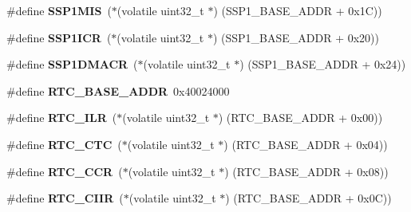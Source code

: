 \begin{DoxyCompactItemize}
\item 
\mbox{\label{group__lpc24xx__regs_gac0b175a58e07fe4a0e092642c783f778}} 
\#define {\bfseries S\+S\+P1\+M\+IS}~($\ast$(volatile uint32\+\_\+t $\ast$) (S\+S\+P1\+\_\+\+B\+A\+S\+E\+\_\+\+A\+D\+DR + 0x1\+C))
\item 
\mbox{\label{group__lpc24xx__regs_gaf86860e9818da75a93859cc1b2bb8ced}} 
\#define {\bfseries S\+S\+P1\+I\+CR}~($\ast$(volatile uint32\+\_\+t $\ast$) (S\+S\+P1\+\_\+\+B\+A\+S\+E\+\_\+\+A\+D\+DR + 0x20))
\item 
\mbox{\label{group__lpc24xx__regs_gadc43e1084fa48f3175dffcd8344bdfea}} 
\#define {\bfseries S\+S\+P1\+D\+M\+A\+CR}~($\ast$(volatile uint32\+\_\+t $\ast$) (S\+S\+P1\+\_\+\+B\+A\+S\+E\+\_\+\+A\+D\+DR + 0x24))
\item 
\mbox{\label{group__lpc24xx__regs_ga33283243f681a8ae4a78650b57ae2ca5}} 
\#define {\bfseries R\+T\+C\+\_\+\+B\+A\+S\+E\+\_\+\+A\+D\+DR}~0x40024000
\item 
\mbox{\label{group__lpc24xx__regs_ga198969e920bdbe81eeb0b9994365bed2}} 
\#define {\bfseries R\+T\+C\+\_\+\+I\+LR}~($\ast$(volatile uint32\+\_\+t $\ast$) (R\+T\+C\+\_\+\+B\+A\+S\+E\+\_\+\+A\+D\+DR + 0x00))
\item 
\mbox{\label{group__lpc24xx__regs_gae9a199544f3888c9789277caddc1be92}} 
\#define {\bfseries R\+T\+C\+\_\+\+C\+TC}~($\ast$(volatile uint32\+\_\+t $\ast$) (R\+T\+C\+\_\+\+B\+A\+S\+E\+\_\+\+A\+D\+DR + 0x04))
\item 
\mbox{\label{group__lpc24xx__regs_ga5aa0f9eb9a40d760e4123632e169b4b2}} 
\#define {\bfseries R\+T\+C\+\_\+\+C\+CR}~($\ast$(volatile uint32\+\_\+t $\ast$) (R\+T\+C\+\_\+\+B\+A\+S\+E\+\_\+\+A\+D\+DR + 0x08))
\item 
\mbox{\label{group__lpc24xx__regs_gaae56933f264cafed754709883e239806}} 
\#define {\bfseries R\+T\+C\+\_\+\+C\+I\+IR}~($\ast$(volatile uint32\+\_\+t $\ast$) (R\+T\+C\+\_\+\+B\+A\+S\+E\+\_\+\+A\+D\+DR + 0x0\+C))
\item 
\mbox{\label{group__lpc24xx__regs_ga7c84d5e4cc9be1e3a2c40c4d1407d6d7}} 

\end{DoxyCompactItemize}
